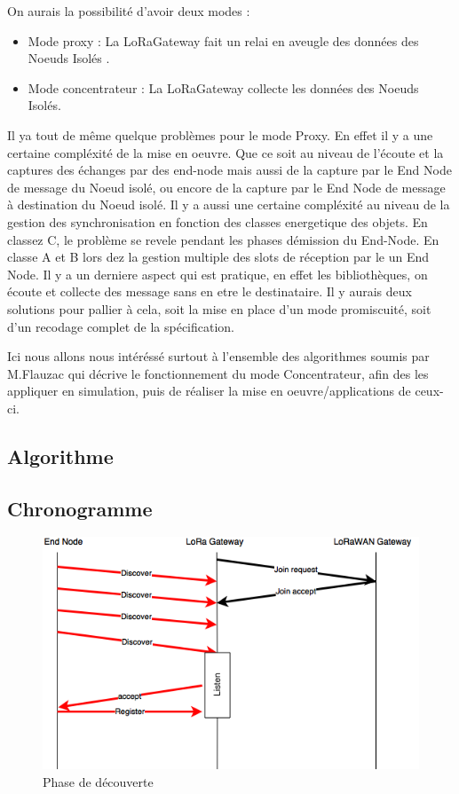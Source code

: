 \documentclass[11pt]{article}
\begin{document}
On aurais la possibilité d'avoir deux modes : 
\begin{itemize}
\item Mode proxy : La LoRaGateway fait un relai en aveugle des données des Noeuds Isolés .
\item Mode concentrateur : La LoRaGateway collecte les données des Noeuds Isolés.
\end{itemize}
Il ya tout de même quelque problèmes pour le mode Proxy. 
En effet il y a une certaine compléxité de la mise en oeuvre. Que ce soit au niveau de l'écoute et la captures des échanges par des end-node mais aussi de la capture par le End Node de message du Noeud isolé, ou encore de la capture par le End Node de message à destination du Noeud isolé. Il y a aussi une certaine compléxité au niveau de la gestion des synchronisation en fonction des classes energetique des objets. En classez C, le problème se revele pendant les phases démission du End-Node. En classe A et B lors dez la gestion multiple des slots de réception par le un End Node. Il y a un derniere aspect qui est pratique, en effet les bibliothèques, on écoute et collecte des message sans en etre le destinataire. Il y aurais deux solutions pour pallier à cela, soit la mise en place d'un mode promiscuité, soit d'un recodage complet de la spécification.


Ici nous allons nous intéréssé surtout à l'ensemble des algorithmes soumis par M.Flauzac qui décrive le fonctionnement du mode Concentrateur, afin des les appliquer en  simulation, puis de réaliser la mise en oeuvre/applications de ceux-ci.

\newpage
\subsection{Algorithme}
\newpage
\subsection{Chronogramme}
\begin{figure}[h!]
\centering
\includegraphics[scale=0.6]{Discovery.png} 
\caption{Phase de découverte}
\end{figure}
\end{document}
